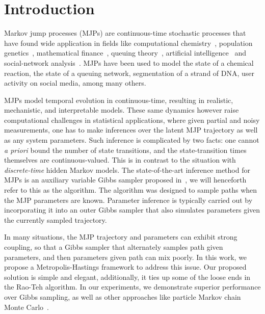 
\section{Introduction}
\label{sec:intro}
Markov jump processes (MJPs) are continuous-time stochastic processes that
have found wide application in fields like computational chemistry~\cite{gillespie97}, 
population genetics~\cite{FearnSher2006}, mathematical finance~\cite{Elliott06}, 
queuing theory~\cite{Breuer2003}, artificial intelligence~\cite{XuShe10} and
social-network analysis~\cite{pan2016markov}. %
MJPs have been used to model the state of a chemical reaction, the state 
of a queuing network, segmentation of a strand of DNA, user activity on social 
media, among many others.

MJPs model temporal evolution in continuous-time, resulting in 
realistic, mechanistic, and interpretable models. %
These same dynamics however raise computational
challenges in statistical applications, where given partial and noisy 
measurements, one has to make inferences over the latent MJP 
trajectory as well as any system parameters. Such
inference is complicated by two facts: one cannot {\em a priori} 
bound the number of state transitions, and the state-transition times themselves
are continuous-valued. This is in contrast to the situation with
{\em discrete-time} hidden Markov models. %
The state-of-the-art inference method for MJPs is an auxiliary variable Gibbs sampler proposed 
in~\cite{RaoTeh13}, we will henceforth refer to this as the {\algname} 
algorithm. The {\algname} algorithm was designed to sample paths when the MJP parameters
are known. Parameter inference is typically carried out by 
incorporating it into an outer Gibbs sampler that also simulates
parameters given the currently sampled trajectory. 

In many situations, the MJP trajectory and parameters can exhibit 
strong coupling, so that a Gibbs sampler that alternately samples path given
parameters, and then parameters given path can mix poorly.  
In this work, we propose a Metropolis-Hastings framework to address
this issue. Our proposed solution is simple and elegant, additionally,
it ties up some of the loose ends in the Rao-Teh algorithm.
In our experiments, we demonstrate superior 
performance over Gibbs sampling, as well as other approaches like 
particle Markov chain Monte Carlo~\cite{Andrieu10}.

